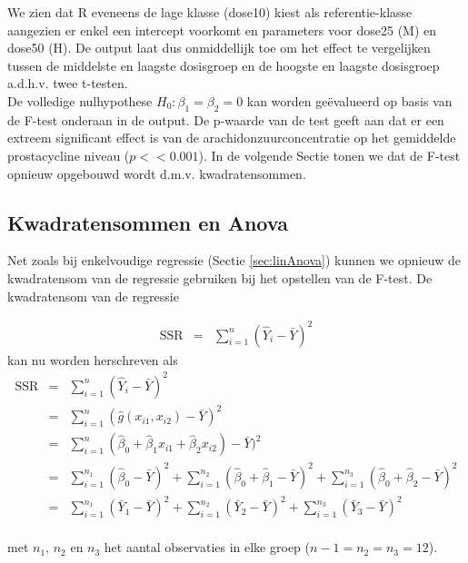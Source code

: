 \documentclass[
  12pt,dutch,coursenotes]{book}
\theoremstyle{definition}
\theoremstyle{definition}
\theoremstyle{definition}
\theoremstyle{remark}
\begin{document}
We zien dat R eveneens de lage klasse (dose10) kiest als referentie-klasse aangezien er enkel een intercept voorkomt en parameters voor dose25 (M) en dose50 (H).
De output laat dus onmiddellijk toe om het effect te vergelijken tussen de middelste en laagste dosisgroep en de hoogste en laagste dosisgroep a.d.h.v. twee t-testen.\\
De volledige nulhypothese \(H_0: \beta_1=\beta_2=0\) kan worden geëvalueerd op basis van de F-test onderaan in de output.
De p-waarde van de test geeft aan dat er een extreem significant effect is van de arachidonzuurconcentratie op het gemiddelde prostacycline niveau (\(p<<0.001\)).
In de volgende Sectie tonen we dat de F-test opnieuw opgebouwd wordt d.m.v. kwadratensommen.

\hypertarget{kwadratensommen-en-anova}{%
\subsection{Kwadratensommen en Anova}\label{kwadratensommen-en-anova}}

Net zoals bij enkelvoudige regressie (Sectie \ref{sec:linAnova}) kunnen we opnieuw de kwadratensom van de regressie gebruiken bij het opstellen van de F-test.
De kwadratensom van de regressie

\begin{eqnarray*}
\text{SSR}&=&\sum\limits_{i=1}^n (\hat Y_{i} -\bar Y)^2
\end{eqnarray*}
kan nu worden herschreven als
\begin{eqnarray*}
\text{SSR}&=&\sum\limits_{i=1}^n (\hat Y_i -\bar Y)^2\\
&=& \sum\limits_{i=1}^n (\hat{g} (x_{i1},x_{i2}) - \bar Y)^2\\
&=& \sum\limits_{i=1}^n (\hat\beta_0+\hat\beta_1x_{i1}+\hat\beta_2x_{i2}) - \bar Y)^2\\
&=& \sum\limits_{i=1}^{n_1} (\hat\beta_0 - \bar Y)^2 +\sum\limits_{i=1}^{n_2} (\hat\beta_0 + \hat\beta_1 - \bar Y)^2+\sum\limits_{i=1}^{n_3} (\hat\beta_0 + \hat\beta_2 - \bar Y)^2\\
&=& \sum\limits_{i=1}^{n_1} (\bar Y_1- \bar Y)^2 +\sum\limits_{i=1}^{n_2} (\bar Y_2- \bar Y)^2+\sum\limits_{i=1}^{n_3} (\bar Y_3 - \bar Y)^2\\
\end{eqnarray*}

met \(n_1\), \(n_2\) en \(n_3\) het aantal observaties in elke groep (\(n-1=n_2=n_3=12\)).
\end{document}
